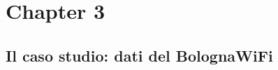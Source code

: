 \clearpage{\pagestyle{empty}\cleardoublepage}
\chapter{Chapter 3}
\section {Il caso studio: dati del BolognaWiFi}
